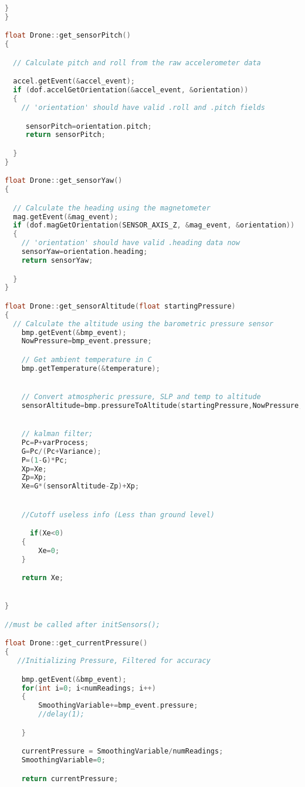 \begin{lstlisting}[language=C,caption={Drone.cpp Arduino Library File},label={lst:Drone.cpp}]
  }
}

float Drone::get_sensorPitch()
{

  // Calculate pitch and roll from the raw accelerometer data

  accel.getEvent(&accel_event);
  if (dof.accelGetOrientation(&accel_event, &orientation))
  {
    // 'orientation' should have valid .roll and .pitch fields

     sensorPitch=orientation.pitch;
     return sensorPitch;

  }
}

float Drone::get_sensorYaw()
{

  // Calculate the heading using the magnetometer
  mag.getEvent(&mag_event);
  if (dof.magGetOrientation(SENSOR_AXIS_Z, &mag_event, &orientation))
  {
    // 'orientation' should have valid .heading data now
    sensorYaw=orientation.heading;
    return sensorYaw;

  }
}

float Drone::get_sensorAltitude(float startingPressure)
{
  // Calculate the altitude using the barometric pressure sensor
    bmp.getEvent(&bmp_event);
    NowPressure=bmp_event.pressure;

    // Get ambient temperature in C
    bmp.getTemperature(&temperature);


    // Convert atmospheric pressure, SLP and temp to altitude
    sensorAltitude=bmp.pressureToAltitude(startingPressure,NowPressure,temperature);


    // kalman filter;
    Pc=P+varProcess;
    G=Pc/(Pc+Variance);
    P=(1-G)*Pc;
    Xp=Xe;
    Zp=Xp;
    Xe=G*(sensorAltitude-Zp)+Xp;


    //Cutoff useless info (Less than ground level)

      if(Xe<0)
    {
        Xe=0;
    }

    return Xe;


}

//must be called after initSensors();

float Drone::get_currentPressure()
{
   //Initializing Pressure, Filtered for accuracy

    bmp.getEvent(&bmp_event);
    for(int i=0; i<numReadings; i++)
    {
        SmoothingVariable+=bmp_event.pressure;
        //delay(1);

    }

    currentPressure = SmoothingVariable/numReadings;
    SmoothingVariable=0;

    return currentPressure;


\end{lstlisting}
